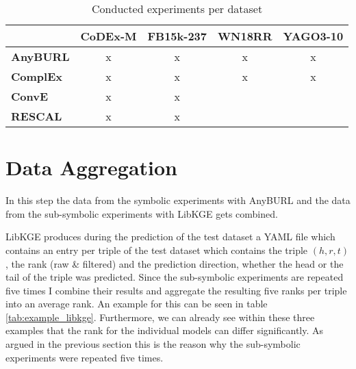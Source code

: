 \begin{table}[H]
\centering
\begin{tabular}{l|cccc}
 & \multicolumn{1}{l}{\textbf{CoDEx-M}} & \multicolumn{1}{l}{\textbf{FB15k-237}} & \multicolumn{1}{l}{\textbf{WN18RR}} & \multicolumn{1}{l}{\textbf{YAGO3-10}} \\ \hline
\textbf{AnyBURL} & x & x & x & x \\
\textbf{ComplEx} & x & x & x & x \\
\textbf{ConvE} & x & x &  &  \\
\textbf{RESCAL} & x & x &  & 
\end{tabular}
\caption{Conducted experiments per dataset}
\label{tab:dataset_models}
\end{table}

\section{Data Aggregation}
In this step the data from the symbolic experiments with AnyBURL and the data from the sub-symbolic experiments with LibKGE gets combined. \hfill \break

LibKGE produces during the prediction of the test dataset a YAML file which contains an entry per triple of the test dataset which contains the triple $(h,r,t)$, the rank (raw \& filtered) and the prediction direction, whether the head or the tail of the triple was predicted. Since the sub-symbolic experiments are repeated five times I combine their results and aggregate the resulting five ranks per triple into an average rank. An example for this can be seen in table \ref{tab:example_libkge}. Furthermore, we can already see within these three examples that the rank for the individual models can differ significantly. As argued in the previous section this is the reason why the sub-symbolic experiments were repeated five times.

